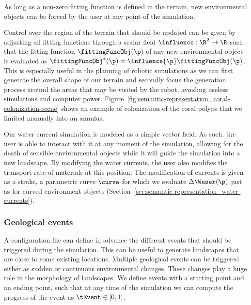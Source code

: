 As long as a non-zero fitting function is defined in the terrain, new environmental objects can be forced by the user at any point of the simulation. 

Control over the region of the terrain that should be updated can be given by adjusting all fitting functions through a scalar field $\influence: \R^2 \to \R $ such that the fitting function $\fittingFuncObj(\p)$ of any new environmental object is evaluated as $\fittingFuncObj^*(\p) = \influence{\p} \fittingFuncObj(\p)$. This is especially useful in the planning of robotic simulations as we can first generate the overall shape of our terrain and secondly focus the generation process around the areas that may be visited by the robot, avoiding useless simulations and computer power. 
Figure~\ref{fig:semantic-representation_coral-colonization-scene} shows an example of colonization of the coral polyps that we limited manually into an annulus.


Our water current simulation is modeled as a simple vector field. As such, the user is able to interact with it at any moment of the simulation, allowing for the death of sensible environmental objects while it will guide the simulation into a new landscape. By modifying the water currents, the user also modifies the transport rate of materials at this position. The modification of currents is given as a stroke, a parametric curve $\curve$ for which we evaluate $\Delta \Wuser(\p)$ just as for curved environment objects (Section~\ref{sec:semantic-representation_water-currents}).

\subsubsection{Geological events}
\label{sec:semantic-representation_events}
A configuration file can define in advance the different events that should be triggered during the simulation. This can be useful to generate landscapes that are close to some existing locations. 
Multiple geological events can be triggered either as sudden or continuous environmental changes. These changes play a huge role in the morphology of landscapes.
We define events with a starting point and an ending point, such that at any time of the simulation we can compute the progress of the event as $\tEvent \in [0, 1]$.

